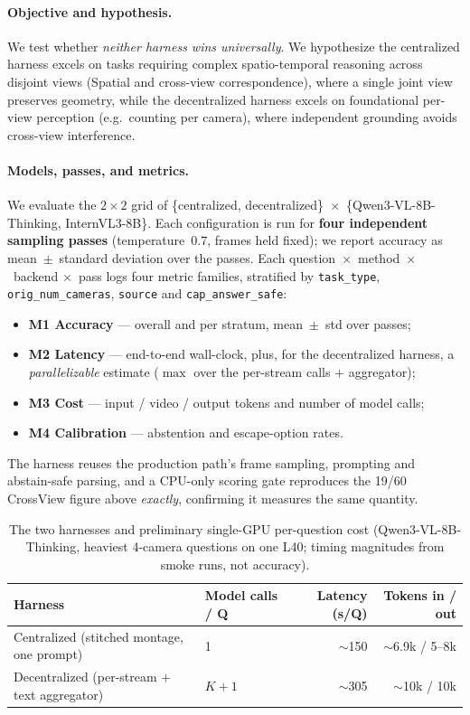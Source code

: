 \documentclass[11pt]{article}
\begin{document}
\paragraph{Objective and hypothesis.} We test whether \emph{neither harness wins universally}. We
hypothesize the centralized harness excels on tasks requiring complex spatio-temporal reasoning
across disjoint views (Spatial and cross-view correspondence), where a single joint view preserves
geometry, while the decentralized harness excels on foundational per-view perception (e.g.\ counting
per camera), where independent grounding avoids cross-view interference.

\paragraph{Models, passes, and metrics.} We evaluate the $2{\times}2$ grid of \{centralized,
decentralized\}~$\times$~\{Qwen3-VL-8B-Thinking, InternVL3-8B\}. Each configuration is run for
\textbf{four independent sampling passes} (temperature~$0.7$, frames held fixed); we report accuracy
as mean~$\pm$~standard deviation over the passes. Each question~$\times$~method~$\times$~backend
$\times$~pass logs four metric families, stratified by \texttt{task\_type},
\texttt{orig\_num\_cameras}, \texttt{source} and \texttt{cap\_answer\_safe}:
\begin{itemize}
  \item \textbf{M1 Accuracy} --- overall and per stratum, mean~$\pm$~std over passes;
  \item \textbf{M2 Latency} --- end-to-end wall-clock, plus, for the decentralized harness, a
        \emph{parallelizable} estimate ($\max$ over the per-stream calls $+$ aggregator);
  \item \textbf{M3 Cost} --- input / video / output tokens and number of model calls;
  \item \textbf{M4 Calibration} --- abstention and escape-option rates.
\end{itemize}
The harness reuses the production path's frame sampling, prompting and abstain-safe parsing, and a
CPU-only scoring gate reproduces the 19/60 CrossView figure above \emph{exactly}, confirming it
measures the same quantity.

\begin{table}[h]
\centering
\caption{The two harnesses and preliminary single-GPU per-question cost (Qwen3-VL-8B-Thinking,
heaviest 4-camera questions on one L40; timing magnitudes from smoke runs, not accuracy).}
\label{tab:methods}
\begin{tabular}{llrr}
\toprule
Harness & Model calls / Q & Latency (s/Q) & Tokens in / out \\
\midrule
Centralized (stitched montage, one prompt) & 1 & $\sim$150 & $\sim$6.9k / 5--8k \\
Decentralized (per-stream $+$ text aggregator) & $K{+}1$ & $\sim$305 & $\sim$10k / 10k \\
\bottomrule
\end{tabular}
\end{table}
\end{document}
